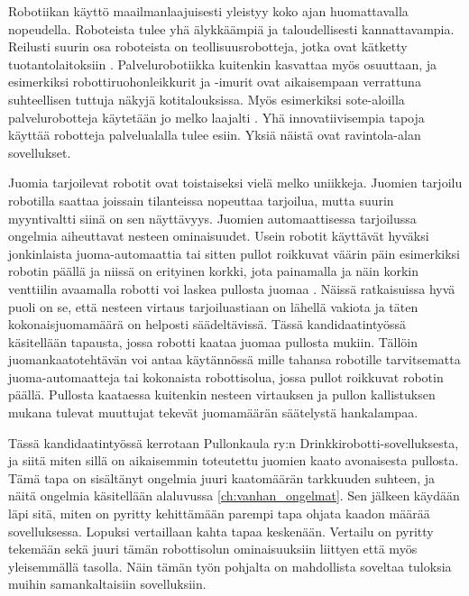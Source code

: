 Robotiikan käyttö maailmanlaajuisesti yleistyy koko ajan huomattavalla nopeudella. Roboteista tulee yhä älykkäämpiä ja taloudellisesti kannattavampia. Reilusti suurin osa roboteista on teollisuusrobotteja, jotka ovat kätketty tuotantolaitoksiin \cite{Heer2020}. Palvelurobotiikka kuitenkin kasvattaa myös osuuttaan, ja esimerkiksi robottiruohonleikkurit ja -imurit ovat aikaisempaan verrattuna suhteellisen tuttuja näkyjä kotitalouksissa. Myös esimerkiksi sote-aloilla palvelurobotteja käytetään jo melko laajalti \cite{Jyvaskylanyliopisto2018}. Yhä innovatiivisempia tapoja käyttää robotteja palvelualalla tulee esiin. Yksiä näistä ovat ravintola-alan sovellukset.

Juomia tarjoilevat robotit ovat toistaiseksi vielä melko uniikkeja. Juomien tarjoilu robotilla saattaa joissain tilanteissa nopeuttaa tarjoilua, mutta suurin myyntivaltti siinä on sen näyttävyys. Juomien automaattisessa tarjoilussa ongelmia aiheuttavat nesteen ominaisuudet. Usein robotit käyttävät hyväksi jonkinlaista juoma-automaattia \cite{Kelly2020} tai sitten pullot roikkuvat väärin päin esimerkiksi robotin päällä ja niissä on erityinen korkki, jota painamalla ja näin korkin venttiilin avaamalla robotti voi laskea pullosta juomaa \cite{Ro2016}. Näissä ratkaisuissa hyvä puoli on se, että nesteen virtaus tarjoiluastiaan on lähellä vakiota ja täten kokonaisjuomamäärä on helposti säädeltävissä. Tässä kandidaatintyössä käsitellään tapausta, jossa robotti kaataa juomaa pullosta mukiin. Tällöin juomankaatotehtävän voi antaa käytännössä mille tahansa robotille tarvitsematta juoma-automaatteja tai kokonaista robottisolua, jossa pullot roikkuvat robotin päällä. Pullosta kaataessa kuitenkin nesteen virtauksen ja pullon kallistuksen mukana tulevat muuttujat tekevät juomamäärän säätelystä hankalampaa.

Tässä kandidaatintyössä kerrotaan Pullonkaula ry:n Drinkkirobotti-sovelluksesta, ja siitä miten sillä on aikaisemmin toteutettu juomien kaato avonaisesta pullosta. Tämä tapa on sisältänyt ongelmia juuri kaatomäärän tarkkuuden suhteen, ja näitä ongelmia käsitellään alaluvussa \ref{ch:vanhan_ongelmat}. Sen jälkeen käydään läpi sitä, miten on pyritty kehittämään parempi tapa ohjata kaadon määrää sovelluksessa. Lopuksi vertaillaan kahta tapaa keskenään. Vertailu on pyritty tekemään sekä juuri tämän robottisolun ominaisuuksiin liittyen että myös yleisemmällä tasolla. Näin tämän työn pohjalta on mahdollista soveltaa tuloksia muihin samankaltaisiin sovelluksiin.
